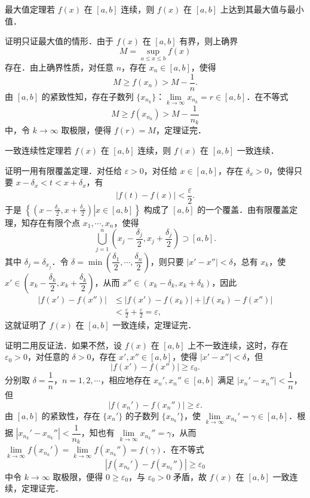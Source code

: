 {\thmheadfont 最大值定理}\quad 若 $f(x)$ 在 $[a, b]$ 连续，则 $f(x)$ 在 $[a, b]$ 上达到其最大值与最小值．

{\thmheadfont 证明}\quad 只证最大值的情形．由于 $f(x)$ 在 $[a, b]$ 有界，则上确界
\[
M = \sup_{a \leqslant x \leqslant b} f(x)
\]
存在．由上确界性质，对任意 $n$，存在 $x_n \in [a, b]$，使得
\[
M \geqslant f(x_n) > M - \frac{1}{n}.
\]
由 $[a, b]$ 的紧致性知，存在子数列 $\{x_{n_k}\}$：$\lim\limits_{k \to \infty} x_{n_k} = r \in [a, b]$．在不等式
\[
M \geqslant f(x_{n_k}) > M - \frac{1}{n_k}
\]
中，令 $k \to \infty$ 取极限，便得 $f(r) = M$，定理证完．

{\thmheadfont 一致连续性定理}\quad 若 $f(x)$ 在 $[a, b]$ 连续，则 $f(x)$ 在 $[a, b]$ 一致连续．

{\thmheadfont 证明一}\quad 用有限覆盖定理．对任给 $\varepsilon > 0$，对任给 $x \in [a, b]$，存在 $\delta_x > 0$，使得只要 $x - \delta_x < t < x + \delta_x$，有
\[
|f(t) - f(x)| < \frac{\varepsilon}{2}.
\]
于是 $\left\{ \left. \left( x - \frac{\delta_x}{2}, x + \frac{\delta_x}{2} \right) \right| x \in [a, b] \right\}$ 构成了 $[a, b]$ 的一个覆盖．由有限覆盖定理，知存在有限个点 $x_1, \cdots, x_n$，使得
\[
\bigcup_{j=1}^{n} \left( x_j - \frac{\delta_j}{2}, x_j + \frac{\delta_j}{2} \right) \supset [a, b].
\]
其中 $\delta_j = \delta_{x_j}$．令 $\delta = \min\left( \dfrac{\delta_1}{2}, \cdots, \dfrac{\delta_n}{2} \right)$，则只要 $|x' - x''| < \delta$，总有 $x_k$，使 $x' \in \left( x_k - \dfrac{\delta_k}{2}, x_k + \dfrac{\delta_k}{2} \right)$，从而 $x'' \in (x_k - \delta_k, x_k + \delta_k)$，因此
\[
\begin{aligned}
|f(x') - f(x'')| &\leqslant |f(x') - f(x_k)| + |f(x_k) - f(x'')| \\
&< \frac{\varepsilon}{2} + \frac{\varepsilon}{2} = \varepsilon,
\end{aligned}
\]
这就证明了 $f(x)$ 在 $[a, b]$ 一致连续，定理证完．

{\thmheadfont 证明二}\quad 用反证法．如果不然，设 $f(x)$ 在 $[a, b]$ 上不一致连续，这时，存在 $\varepsilon_0 > 0$，对任意的 $\delta > 0$，存在 $x', x'' \in [a, b]$，使得 $|x' - x''| < \delta$，但
\[
|f(x') - f(x'')| \geqslant \varepsilon_0.
\]
分别取 $\delta = \dfrac{1}{n}$，$n = 1, 2, \cdots$，相应地存在 $x_n', x_n'' \in [a, b]$ 满足 $|x_n' - x_n''| < \dfrac{1}{n}$，但
\[
|f(x_n') - f(x_n'')| \geqslant \varepsilon.
\]
由 $[a, b]$ 的紧致性，存在 $\{x_n'\}$ 的子数列 $\{x_{n_k}'\}$，使 $\lim\limits_{k \to \infty} x_{n_k}' = \gamma \in [a, b]$．根据 $|x_{n_k}' - x_{n_k}''| < \dfrac{1}{n_k}$，知也有 $\lim\limits_{k \to \infty} x_{n_k}'' = \gamma$，从而 $\lim\limits_{k \to \infty} f(x_{n_k}') = \lim\limits_{k \to \infty} f(x_{n_k}'') = f(\gamma)$．在不等式
\[
|f(x_{n_k}') - f(x_{n_k}'')| \geqslant \varepsilon_0
\]
中令 $k \to \infty$ 取极限，便得 $0 \geqslant \varepsilon_0$，与 $\varepsilon_0 > 0$ 矛盾，故 $f(x)$ 在 $[a, b]$ 一致连续，定理证完．

